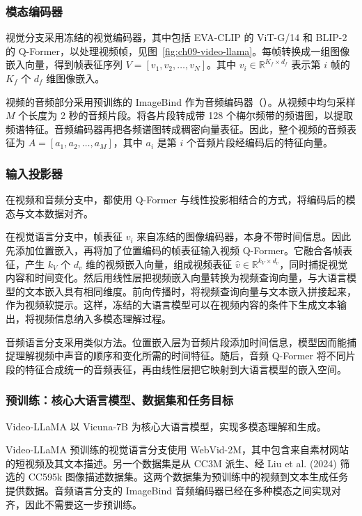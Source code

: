 \subsubsection{模态编码器}
视觉分支采用冻结的视觉编码器，其中包括 EVA-CLIP 的 ViT-G/14 和 BLIP-2 的 Q-Former，以处理视频帧，见图~\ref{fig:ch09-video-llama}。每帧转换成一组图像嵌入向量，得到帧表征序列 $V=[v_1,v_2,\ldots,v_N]$。其中 $v_i\in\mathbb{R}^{K_f\times d_f}$ 表示第 $i$ 帧的 $K_f$ 个 $d_f$ 维图像嵌入。

视频的音频部分采用预训练的 ImageBind 作为音频编码器（）。从视频中均匀采样 $M$ 个长度为 2 秒的音频片段。将各片段转成带 128 个梅尔频带的频谱图，以提取频谱特征。音频编码器再把各频谱图转成稠密向量表征。因此，整个视频的音频表征为 $A=[a_1,a_2,\ldots,a_M]$，其中 $a_i$ 是第 $i$ 个音频片段经编码后的特征向量。


\subsubsection{输入投影器}
在视频和音频分支中，都使用 Q-Former 与线性投影相结合的方式，将编码后的模态与文本数据对齐。

在视觉语言分支中，帧表征 $v_i$ 来自冻结的图像编码器，本身不带时间信息。因此先添加位置嵌入，再将加了位置编码的帧表征输入视频 Q-Former。它融合各帧表征，产生 $k_V$ 个 $d_v$ 维的视频嵌入向量，组成视频表征 $\hat{v}\in\mathbb{R}^{k_V\times d_v}$，同时捕捉视觉内容和时间变化。然后用线性层把视频嵌入向量转换为视频查询向量，与大语言模型的文本嵌入具有相同维度。前向传播时，将视频查询向量与文本嵌入拼接起来，作为视频软提示。这样，冻结的大语言模型可以在视频内容的条件下生成文本输出，将视频信息纳入多模态理解过程。

音频语言分支采用类似方法。位置嵌入层为音频片段添加时间信息，模型因而能捕捉理解视频中声音的顺序和变化所需的时间特征。随后，音频 Q-Former 将不同片段的特征合成统一的音频表征，再由线性层把它映射到大语言模型的嵌入空间。

\subsubsection{预训练：核心大语言模型、数据集和任务目标}
Video-LLaMA 以 Vicuna-7B 为核心大语言模型，实现多模态理解和生成。

Video-LLaMA 预训练的视觉语言分支使用 WebVid-2M，其中包含来自素材网站的短视频及其文本描述。另一个数据集是从 CC3M 派生、经 Liu et al. (2024) 筛选的 CC595k 图像描述数据集。这两个数据集为预训练中的视频到文本生成任务提供数据。音频语言分支的 ImageBind 音频编码器已经在多种模态之间实现对齐，因此不需要这一步预训练。

